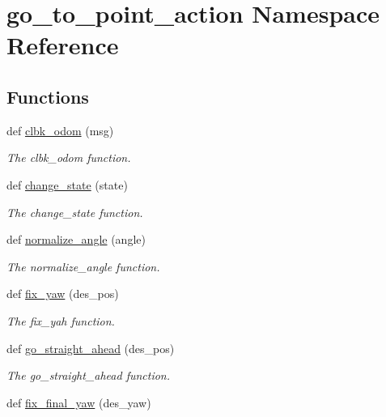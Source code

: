\hypertarget{namespacego__to__point__action}{}\section{go\+\_\+to\+\_\+point\+\_\+action Namespace Reference}
\label{namespacego__to__point__action}
\subsection*{Functions}
\begin{DoxyCompactItemize}
\item 
def \hyperlink{namespacego__to__point__action_affe1389e38557b69ee71adea85b846b2}{clbk\+\_\+odom} (msg)
\begin{DoxyCompactList}\small\item\em The clbk\+\_\+odom function. \end{DoxyCompactList}\item 
def \hyperlink{namespacego__to__point__action_ab7ad2629ed9ffbd5d9b7ca9c540d932a}{change\+\_\+state} (state)
\begin{DoxyCompactList}\small\item\em The change\+\_\+state function. \end{DoxyCompactList}\item 
def \hyperlink{namespacego__to__point__action_a0bca87c6d45ca63d3152a4e8def72e2a}{normalize\+\_\+angle} (angle)
\begin{DoxyCompactList}\small\item\em The normalize\+\_\+angle function. \end{DoxyCompactList}\item 
def \hyperlink{namespacego__to__point__action_a18e7fef09d30f59bb91061f4b91f87e6}{fix\+\_\+yaw} (des\+\_\+pos)
\begin{DoxyCompactList}\small\item\em The fix\+\_\+yah function. \end{DoxyCompactList}\item 
def \hyperlink{namespacego__to__point__action_a7c35034eab524fbff7d05d80fd65ede4}{go\+\_\+straight\+\_\+ahead} (des\+\_\+pos)
\begin{DoxyCompactList}\small\item\em The go\+\_\+straight\+\_\+ahead function. \end{DoxyCompactList}\item 
def \hyperlink{namespacego__to__point__action_a068188471dd5fc0ed3ea371e3a32338a}{fix\+\_\+final\+\_\+yaw} (des\+\_\+yaw)

\end{DoxyCompactItemize}
